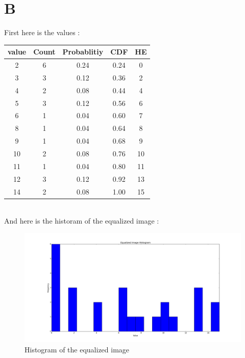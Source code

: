 \documentclass{article}
\begin{document}
 \section *{B}
First here is the values :\\
\begin{tabular}{|c|c|c|c|c|}
\hline
value&Count&Probablitiy&CDF&HE\\ \hline 
 2&6&0.24&0.24&0\\ \hline 
 3&3&0.12&0.36&2\\ \hline 
 4&2&0.08&0.44&4\\ \hline 
 5&3&0.12&0.56&6\\ \hline 
 6&1&0.04&0.60&7\\ \hline 
 8&1&0.04&0.64&8\\ \hline 
 9&1&0.04&0.68&9\\ \hline 
 10&2&0.08&0.76&10\\ \hline 
 11&1&0.04&0.80&11\\ \hline 
 12&3&0.12&0.92&13\\ \hline 
 14&2&0.08&1.00&15 \\ \hline
\end{tabular}\\
And here is the historam of the equalized image : 
 \begin{figure}[H]
 \includegraphics[trim={5cm 0cm 5cm 0cm},clip,scale=0.4]{histogram_eq.png}
 \caption{Histogram of the equalized image}
 \end{figure}
\end{document}
